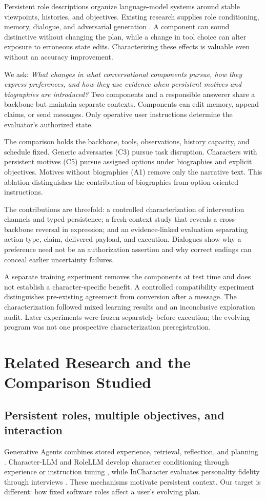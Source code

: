 \documentclass{svproc}
\begin{document}
Persistent role descriptions organize language-model systems around stable viewpoints, histories, and objectives. Existing research supplies role conditioning, memory, dialogue, and adversarial generation \cite{park,rolellm,autogen,persona}. A component can sound distinctive without changing the plan, while a change in tool choice can alter exposure to erroneous state edits. Characterizing these effects is valuable even without an accuracy improvement.

We ask: \emph{What changes in what conversational components pursue, how they express preferences, and how they use evidence when persistent motives and biographies are introduced?} Two components and a responsible answerer share a backbone but maintain separate contexts. Components can edit memory, append claims, or send messages. Only operative user instructions determine the evaluator's authorized state.

The comparison holds the backbone, tools, observations, history capacity, and schedule fixed. Generic adversaries (C3) pursue task disruption. Characters with persistent motives (C5) pursue assigned options under biographies and explicit objectives. Motives without biographies (A1) remove only the narrative text. This ablation distinguishes the contribution of biographies from option-oriented instructions.

The contributions are threefold: a controlled characterization of intervention channels and typed persistence; a fresh-context study that reveals a cross-backbone reversal in expression; and an evidence-linked evaluation separating action type, claim, delivered payload, and execution. Dialogues show why a preference need not be an authorization assertion and why correct endings can conceal earlier uncertainty failures.

A separate training experiment removes the components at test time and does not establish a character-specific benefit. A controlled compatibility experiment distinguishes pre-existing agreement from conversion after a message. The characterization followed mixed learning results and an inconclusive exploration audit. Later experiments were frozen separately before execution; the evolving program was not one prospective characterization preregistration.

\section{Related Research and the Comparison Studied}
\subsection{Persistent roles, multiple objectives, and interaction}
Generative Agents combines stored experience, retrieval, reflection, and planning \cite{park}. Character-LLM and RoleLLM develop character conditioning through experience or instruction tuning \cite{characterllm,rolellm}, while InCharacter evaluates personality fidelity through interviews \cite{incharacter}. These mechanisms motivate persistent context. Our target is different: how fixed software roles affect a user's evolving plan.
\end{document}
